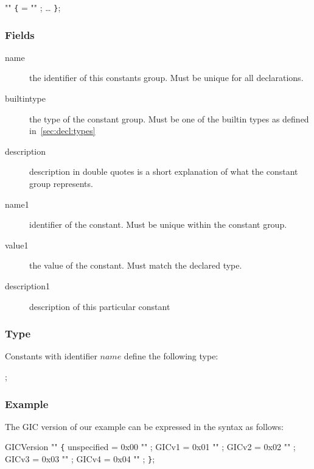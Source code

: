 \documentclass[a4paper,11pt,twoside]{report}
\begin{document}
{{\begin{syntax}
   "" \verb+{+
     =  "" ;
    \ldots
\verb+}+;
\end{syntax}

\subsubsection{Fields}

\begin{description}
    \item[name] the identifier of this constants group. Must be unique for all 
                declarations.
    
    \item [builtintype] the type of the constant group. Must be one of the 
                        builtin types as defined in~\ref{sec:decl:types}
    
    \item [description] description in double quotes is a short explanation of
                        what the constant group represents.
    
    \item [name1] identifier of the constant. Must be unique within the 
                  constant group. 
    
    \item [value1] the value of the constant. Must match the declared type.
    
    \item [description1] description of this particular constant
    
\end{description}

\subsubsection{Type}
Constants with identifier $name$ define the following type:
\begin{syntax}
 ;
\end{syntax}


\subsubsection{Example}
The GIC version of our example can be expressed in the syntax as follows: 

\begin{syntax}
 GICVersion  "" \verb+{+
    unspecified = 0x00 "" ;    
    GICv1       = 0x01 "" ;
    GICv2       = 0x02 "" ;
    GICv3       = 0x03 "" ;
    GICv4       = 0x04 "" ;
\verb+}+;
\end{syntax}

}}
\end{document}
